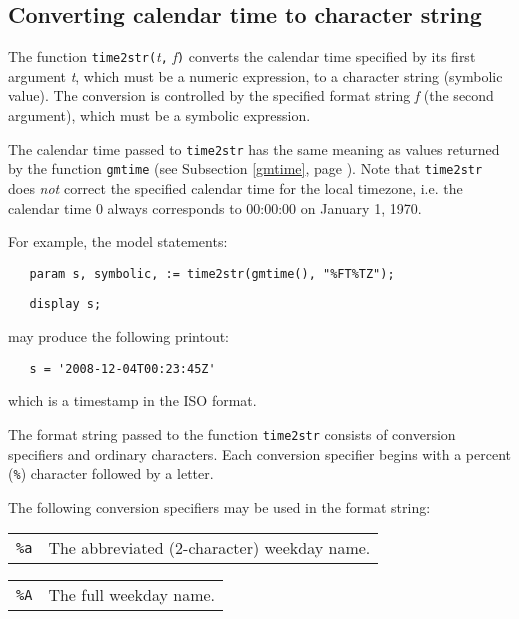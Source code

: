 \documentclass[10pt]{article}
\begin{document}
\subsection{Converting calendar time to character string}
\label{time2str}

The function {\tt time2str(}{\it t}{\tt,} {\it f}{\tt)} converts the
calendar time specified by its first argument {\it t}, which must be a
numeric expression, to a character string (symbolic value). The
conversion is controlled by the specified format string {\it f} (the
second argument), which must be a symbolic expression.

The calendar time passed to {\tt time2str} has the same meaning as
values returned by the function {\tt gmtime} (see Subsection
\ref{gmtime}, page \pageref{gmtime}). Note that {\tt time2str} does
{\it not} correct the specified calendar time for the local timezone,
i.e. the calendar time 0 always corresponds to 00:00:00 on January 1,
1970.

For example, the model statements:

\medskip

\verb|   param s, symbolic, := time2str(gmtime(), "%FT%TZ");|

\verb|   display s;|

\medskip

\noindent may produce the following printout:

\medskip

\verb|   s = '2008-12-04T00:23:45Z'|

\medskip

\noindent which is a timestamp in the ISO format.

The format string passed to the function {\tt time2str} consists of
conversion specifiers and ordinary characters. Each conversion
specifier begins with a percent ({\tt\%}) character followed by a
letter.

The following conversion specifiers may be used in the format string:

\medskip

\begin{tabular}{@{}p{20pt}p{298pt}@{}}
{\tt\%a}&The abbreviated (2-character) weekday name.\\
\end{tabular}

\medskip

\begin{tabular}{@{}p{20pt}p{298pt}@{}}
{\tt\%A}&The full weekday name.\\
\end{tabular}
\end{document}
